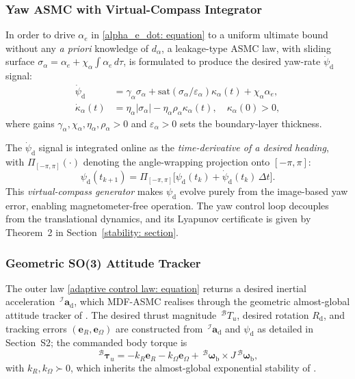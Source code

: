 \subsubsection{Yaw ASMC with Virtual-Compass Integrator}
In order to drive $\alpha_e$ in \eqref{alpha_e_dot: equation} to a uniform ultimate bound without any \emph{a priori} knowledge of $d_{\alpha}$, a leakage-type ASMC law, with sliding surface $\sigma_{\alpha}=\alpha_e+\chi_{\alpha}\!\int\alpha_e\,d\tau$, is formulated to produce the desired yaw-rate $\dot{\psi}_\text{d}$ signal:
\begin{align} \label{yaw control law: equation}
    \dot{\psi}_\text{d} &= \gamma_{\alpha}\sigma_{\alpha} + \text{sat}(\sigma_{\alpha}/\varepsilon_{\alpha})\kappa_{\alpha}(t) + \chi_{\alpha} \alpha_e, \nonumber\\
    \dot{\kappa}_{\alpha}(t) &= \eta_{\alpha}|\sigma_{\alpha}| - \eta_{\alpha}\rho_{\alpha}\kappa_{\alpha}(t),\quad\kappa_{\alpha}(0)>0,
\end{align}
where gains $\gamma_{\alpha}, \chi_{\alpha}, \eta_{\alpha}, \rho_{\alpha} > 0$ and $\varepsilon_{\alpha}>0$ sets the boundary-layer thickness.

The $\dot{\psi}_\text{d}$ signal is integrated online as the \emph{time-derivative of a desired heading}, with $\Pi_{[-\pi,\pi]}(\cdot)$ denoting the angle-wrapping projection onto $[-\pi,\pi]$:
\begin{equation} \label{psi d integrator: equation}
    \psi_\text{d}(t_{k+1}) = \Pi_{[-\pi,\pi]}\!\big[\psi_\text{d}(t_k) + \dot{\psi}_\text{d}(t_k)\,\Delta t\big].
\end{equation}
This \emph{virtual-compass generator} makes $\psi_\text{d}$ evolve purely from the image-based yaw error, enabling magnetometer-free operation. The yaw control loop decouples from the translational dynamics, and its Lyapunov certificate is given by Theorem~2 in Section~\ref{stability: section}.

\subsubsection{Geometric SO(3) Attitude Tracker} \label{so3 inner loop: section}
The outer law \eqref{adaptive control law: equation} returns a desired inertial acceleration $\,^\mathcal{I}\boldsymbol{a}_\text{d}$, which MDF-ASMC realises through the geometric almost-global attitude tracker of \cite{lee2010}. The desired thrust magnitude $\,^\mathcal{B}T_u$, desired rotation $R_\text{d}$, and tracking errors $(\boldsymbol{e}_R,\boldsymbol{e}_\Omega)$ are constructed from $\,^\mathcal{I}\boldsymbol{a}_\text{d}$ and $\psi_\text{d}$ as detailed in Section~S2; the commanded body torque is
\begin{equation} \label{so3 torque: equation}
    \,^\mathcal{B}\boldsymbol{\tau}_u = -k_R\boldsymbol{e}_R - k_\Omega\boldsymbol{e}_\Omega + \,^\mathcal{B} \boldsymbol{\omega}_{\text{b}}\times J\,^\mathcal{B} \boldsymbol{\omega}_{\text{b}},
\end{equation}
with $k_R,k_\Omega\succ 0$, which inherits the almost-global exponential stability of \cite[Thm.~3.1]{lee2010}.

